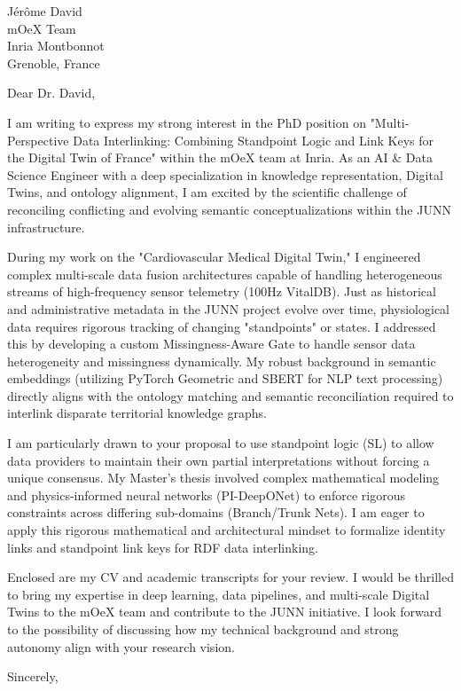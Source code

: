 \documentclass[11pt,a4paper]{letter}
\begin{document}
\begin{letter}{
    Jérôme David \\
    mOeX Team \\
    Inria Montbonnot \\
    Grenoble, France
}

\opening{Dear Dr. David,}

I am writing to express my strong interest in the PhD position on "Multi-Perspective Data Interlinking: Combining Standpoint Logic and Link Keys for the Digital Twin of France" within the mOeX team at Inria. As an AI \& Data Science Engineer with a deep specialization in knowledge representation, Digital Twins, and ontology alignment, I am excited by the scientific challenge of reconciling conflicting and evolving semantic conceptualizations within the JUNN infrastructure.

During my work on the "Cardiovascular Medical Digital Twin," I engineered complex multi-scale data fusion architectures capable of handling heterogeneous streams of high-frequency sensor telemetry (100Hz VitalDB). Just as historical and administrative metadata in the JUNN project evolve over time, physiological data requires rigorous tracking of changing "standpoints" or states. I addressed this by developing a custom Missingness-Aware Gate to handle sensor data heterogeneity and missingness dynamically. My robust background in semantic embeddings (utilizing PyTorch Geometric and SBERT for NLP text processing) directly aligns with the ontology matching and semantic reconciliation required to interlink disparate territorial knowledge graphs.

I am particularly drawn to your proposal to use standpoint logic (SL) to allow data providers to maintain their own partial interpretations without forcing a unique consensus. My Master's thesis involved complex mathematical modeling and physics-informed neural networks (PI-DeepONet) to enforce rigorous constraints across differing sub-domains (Branch/Trunk Nets). I am eager to apply this rigorous mathematical and architectural mindset to formalize identity links and standpoint link keys for RDF data interlinking.

Enclosed are my CV and academic transcripts for your review. I would be thrilled to bring my expertise in deep learning, data pipelines, and multi-scale Digital Twins to the mOeX team and contribute to the JUNN initiative. I look forward to the possibility of discussing how my technical background and strong autonomy align with your research vision.

\closing{Sincerely,}

\end{letter}
\end{document}
